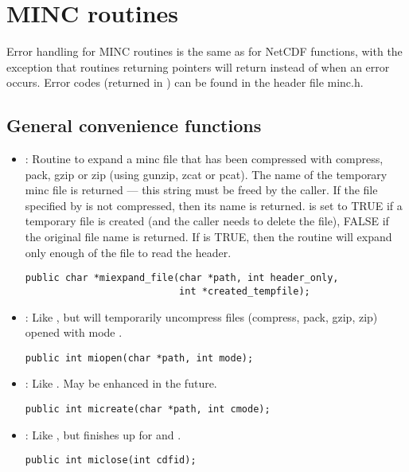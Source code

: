 \section{MINC routines}

Error handling for MINC routines is the same as for NetCDF functions,
with the exception that routines returning pointers will return
 instead of  when an error occurs. Error
codes (returned in ) can be found in the header file
minc.h.

\subsection{General convenience functions}

\begin{itemize}

\item {} : Routine to expand a minc file that has
been compressed with compress, pack, gzip or zip (using gunzip, zcat
or pcat). The name of the temporary minc file is returned --- this
string must be freed by the caller. If the file specified by
 is not compressed, then its name is returned.
 is set to TRUE if a temporary file is
created (and the caller needs to delete the file), FALSE if the
original file name is returned. If 
 is TRUE, then the routine will expand
only enough of the file to read the header.
\begin{verbatim}
public char *miexpand_file(char *path, int header_only, 
                           int *created_tempfile);
\end{verbatim}

\item {} : Like , but will temporarily
uncompress files (compress, pack, gzip, zip) opened with mode 
.
\begin{verbatim}
public int miopen(char *path, int mode);
\end{verbatim}

\item {} : Like . May be enhanced in the future.
\begin{verbatim}
public int micreate(char *path, int cmode);
\end{verbatim}

\item {} : Like , but finishes up for 
and .
\begin{verbatim}
public int miclose(int cdfid);
\end{verbatim}


\end{itemize}
